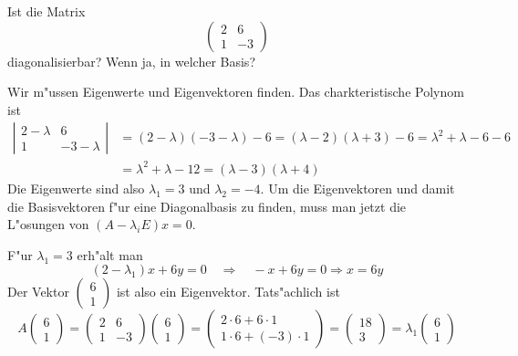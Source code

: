 Ist die Matrix
\[
\begin{pmatrix}
2&6\\
1&-3
\end{pmatrix}
\]
diagonalisierbar? Wenn ja, in welcher Basis?

\begin{loesung}
Wir m"ussen Eigenwerte und Eigenvektoren finden. Das charkteristische
Polynom ist
\begin{align*}
\left|\begin{matrix}
2-\lambda&6\\
1&-3-\lambda
\end{matrix}\right|
&=(2-\lambda)(-3-\lambda)-6=(\lambda-2)(\lambda+3)-6=\lambda^2+\lambda-6-6
\\
&=\lambda^2+\lambda-12=(\lambda-3)(\lambda + 4)
\end{align*}
Die Eigenwerte sind also $\lambda_1=3$ und $\lambda_2=-4$. Um die Eigenvektoren und damit
die Basisvektoren f"ur eine Diagonalbasis zu finden, muss man
jetzt die L"osungen von $(A-\lambda_i E)x=0$.

F"ur $\lambda_1=3$ erh"alt man
\[
(2-\lambda_1)x+6y=0\quad\Rightarrow\quad -x+6y=0\Rightarrow x = 6y
\]
Der Vektor
$\begin{pmatrix}6\\1\end{pmatrix}$
ist also ein Eigenvektor. Tats"achlich ist
\[
A\begin{pmatrix}6\\1\end{pmatrix}
=
\begin{pmatrix}
2&6\\
1&-3
\end{pmatrix}
\begin{pmatrix}6\\1\end{pmatrix}
=\begin{pmatrix}
2\cdot 6+6\cdot 1\\
1\cdot 6+(-3)\cdot 1
\end{pmatrix}
=\begin{pmatrix}
18\\
3
\end{pmatrix}
=
\lambda_1 
\begin{pmatrix}6\\1\end{pmatrix}
\]


\end{loesung}
